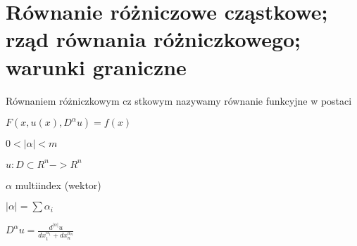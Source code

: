 \section{Równanie różniczowe cząstkowe; rząd równania różniczkowego; warunki graniczne}
Równaniem różniczkowym cz
stkowym nazywamy równanie funkcyjne w postaci

$F(x ,u(x) , D^\alpha u) = f(x)$

$0<|\alpha| < m$

$u:D \subset R^n -> R^n$

$\alpha$ multiindex (wektor)

$|\alpha| = \sum \alpha_i$

$D^\alpha u = \frac{d^{|\alpha|} u}{dx_1^{\alpha_1} + dx_n^{\alpha_n}}$